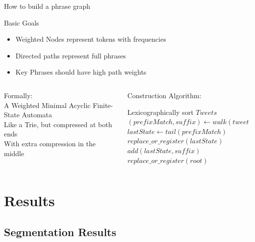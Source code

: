 \documentclass[compress]{beamer}
\begin{document}
\begin{frame}{How to build a phrase graph}
\begin{block}{Basic Goals}
\begin{itemize}
\item Weighted Nodes represent tokens with frequencies
\item Directed paths represent full phrases
\item Key Phrases should have high path weights
\end{itemize}
\end{block}

\pause

\begin{columns}
\begin{column}[1]{5cm}
Formally: \\
A Weighted Minimal Acyclic Finite-State Automata \\
Like a Trie, but compressed at both ends \\
With extra compression in the middle \\
\pause
\end{column}
\begin{column}[2]{5cm}
Construction Algorithm\cite{daciuk99incremental}:
{\tiny
\begin{algorithm}[H]
Lexicographically sort $Tweets$ \\
 {
    $(prefixMatch, suffix) \leftarrow walk(tweet)$ \\
    $lastState \leftarrow tail(prefixMatch)$ \\
     {
        $replace\_or\_register(lastState)$
    }
    $add(lastState, suffix)$ \\
}
$replace\_or\_register(root)$
\end{algorithm}
}

\end{column}
\end{columns}
\end{frame}

\section{Results}
\subsection{Segmentation Results}
\end{document}
